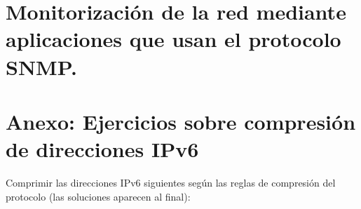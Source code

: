\documentclass[letterpaper,10pt,spanish]{sphinxmanual}
\begin{document}
\section{Monitorización de la red mediante aplicaciones que usan el protocolo SNMP.}
\label{\detokenize{t2_integracion_elementos/apuntes_t2:monitorizacion-de-la-red-mediante-aplicaciones-que-usan-el-protocolo-snmp}}

\section{Anexo: Ejercicios sobre compresión de direcciones IPv6}
\label{\detokenize{t2_integracion_elementos/apuntes_t2:anexo-ejercicios-sobre-compresion-de-direcciones-ipv6}}
Comprimir las direcciones IPv6 siguientes según las reglas de compresión del protocolo (las soluciones aparecen al final):
\end{document}
